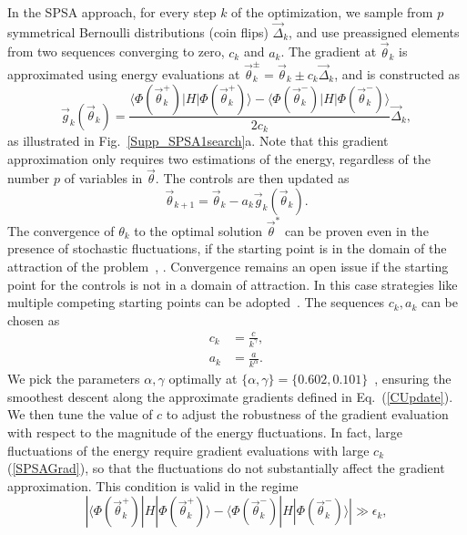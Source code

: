\documentclass[twocolumn]{revtex4-1}
\newcommand{\1}{\mathbbm{1}}
\begin{document}
In the SPSA approach, for every step $k$ of the optimization, we sample from $p$ symmetrical Bernoulli distributions (coin flips) $\vec\Delta_k$, and use preassigned elements from two sequences converging to zero, $c_k$ and $a_k$. The gradient at ${\vec \theta}_k$ is approximated using energy evaluations at ${\vec \theta}^\pm_k={\vec \theta}_k\pm c_k{\vec \Delta}_k$, and is constructed as
\begin{equation}
\label{SPSAGrad}
{\vec g}_k({\vec \theta_k})=\frac{\langle\Phi({\vec \theta^+_k})|H|\Phi({\vec \theta^+_k})\rangle-\langle\Phi({\vec \theta^-_k})|H|\Phi({\vec \theta^-_k})\rangle}{2c_k}{\vec \Delta}_k,
\end{equation} 
as illustrated in Fig.~\ref{Supp_SPSA1search}a. Note that this gradient approximation only requires two estimations of the energy, regardless of the number $p$ of variables in $\vec\theta$. The controls are then updated as 
\begin{equation}
\label{CUpdate}
{\vec \theta}_{k+1}={\vec \theta}_k-a_k {\vec g}_k(\vec\theta_k).
\end{equation}
The convergence of $\theta_k$ to the optimal solution ${\vec \theta}^*$ can be proven even in the presence of stochastic fluctuations, if the starting point is in the domain of the attraction of the problem~\cite{Spall1992S}, . Convergence remains an open issue if the starting point for the controls is not in a domain of attraction. In this case strategies like multiple competing starting points can be adopted~\cite{Wecker2015S}.  
The sequences $c_k,a_k$ can be chosen as
\begin{align}
c_k&=\frac{c}{k^\gamma},\nonumber\\
\label{alphagamma}a_k&=\frac{a}{k^\alpha}.
\end{align}
We pick the parameters $\alpha, \gamma$ optimally at $\{\alpha,\gamma\}=\{0.602,0.101\}$~\cite{Spall1998S}, ensuring the smoothest descent along the approximate gradients defined in Eq.~(\ref{CUpdate}). 
We then tune the value of $c$ to adjust the robustness of the gradient evaluation with respect to the magnitude of the energy fluctuations. In fact, large fluctuations of the energy require gradient evaluations with large $c_k$ (\ref{SPSAGrad}), so that the fluctuations do not substantially affect the gradient approximation. This condition is valid in the regime 
\begin{equation}
\label{GradRegime}
|\langle\Phi(\vec\theta^+_k)|H|\Phi(\vec\theta^+_k)\rangle-\langle\Phi(\vec\theta^-_k)|H|\Phi(\vec\theta^-_k)\rangle| \gg \epsilon_k,
\end{equation}
\end{document}

